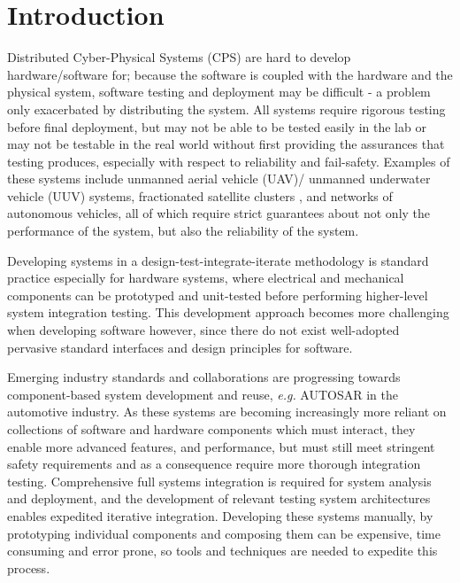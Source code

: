 \section{Introduction}

Distributed Cyber-Physical Systems (CPS) are hard to develop
hardware/software for; because the software is coupled with the
hardware and the physical system, software testing and deployment may
be difficult - a problem only exacerbated by distributing the system.
All systems require rigorous testing before final deployment, but may
not be able to be tested easily in the lab or may not be testable in
the real world without first providing the assurances that testing
produces, especially with respect to reliability and fail-safety.
Examples of these systems include unmanned aerial vehicle (UAV)/
unmanned underwater vehicle (UUV) systems, fractionated satellite
clusters \cite{brown2006fractionated}, and networks of autonomous vehicles, all of which require
strict guarantees about not only the performance of the system, but
also the reliability of the system.

Developing systems in a design-test-integrate-iterate methodology is
standard practice especially for hardware systems, where electrical
and mechanical components can be prototyped and unit-tested before
performing higher-level system integration testing.  This development
approach becomes more challenging when developing software however,
since there do not exist well-adopted pervasive standard interfaces
and design principles for software.

Emerging industry standards and collaborations are progressing towards
component-based system development and reuse, \emph{e.g.}
AUTOSAR\cite{autosar} in the automotive industry.  As these systems
are becoming increasingly more reliant on collections of software and
hardware components which must interact, they enable more advanced
features, and performance, but must still meet stringent safety
requirements and as a consequence require more thorough integration
testing.  Comprehensive full systems integration is required for
system analysis and deployment, and the development of relevant
testing system architectures enables expedited iterative integration.
Developing these systems manually, by prototyping individual
components and composing them can be expensive, time consuming and
error prone, so tools and techniques are needed to expedite this
process.

